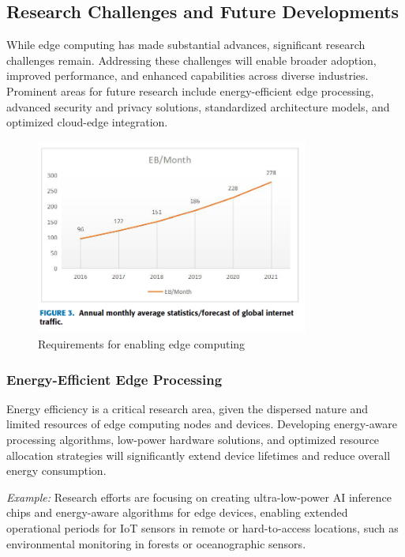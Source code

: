 \documentclass[runningheads]{llncs}
\begin{document}
\subsection{Research Challenges and Future Developments}

While edge computing has made substantial advances, significant research challenges remain. Addressing these challenges will enable broader adoption, improved performance, and enhanced capabilities across diverse industries. Prominent areas for future research include energy-efficient edge processing, advanced security and privacy solutions, standardized architecture models, and optimized cloud-edge integration.

\begin{figure}[ht]
    \centering
    \includegraphics[width=0.8\textwidth]{IMG/8.png}
    \caption{Requirements for enabling edge computing}
    \label{fig:edge_requirements}
    \end{figure}

\subsubsection{Energy-Efficient Edge Processing}
Energy efficiency is a critical research area, given the dispersed nature and limited resources of edge computing nodes and devices. Developing energy-aware processing algorithms, low-power hardware solutions, and optimized resource allocation strategies will significantly extend device lifetimes and reduce overall energy consumption.

\textit{Example:} Research efforts are focusing on creating ultra-low-power AI inference chips and energy-aware algorithms for edge devices, enabling extended operational periods for IoT sensors in remote or hard-to-access locations, such as environmental monitoring in forests or oceanographic sensors.
\end{document}
